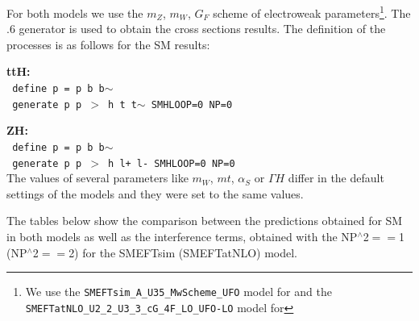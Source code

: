 For both models we use the $m_Z$, $m_W$, $G_F$ scheme of electroweak parameters\footnote{We use the \texttt{SMEFTsim\_A\_U35\_MwScheme\_UFO} model for \SMEFTsim and the \texttt{SMEFTatNLO\_U2\_2\_U3\_3\_cG\_4F\_LO\_UFO-LO} model for \SMEFTatNLO}. The .6 generator is used to obtain the cross sections results. The definition of the processes is as follows for the SM results:

\noindent
{\bf ttH:}\\
\noindent
  \texttt{ define p = p b b$\sim$ }\\
  \texttt{ generate p p $>$ h t t$\sim$ SMHLOOP=0 NP=0 }

\noindent
{\bf ZH:}\\
  \noindent
  \texttt{ define p = p b b$\sim$} \\
  \texttt{ generate p p $>$ h l+ l- SMHLOOP=0  NP=0     }\\
  
  The values of several parameters like $m_W$, $mt$, $\alpha_S$ or $\Gamma H$ differ in the default settings of the models and they were set to the same values.

  The tables below show the comparison between the predictions obtained for SM in both models as well as the interference terms, obtained with the NP$^{\wedge}$2$==$1 (NP$^{\wedge}$2$==$2)  for the SMEFTsim (SMEFTatNLO) model.

